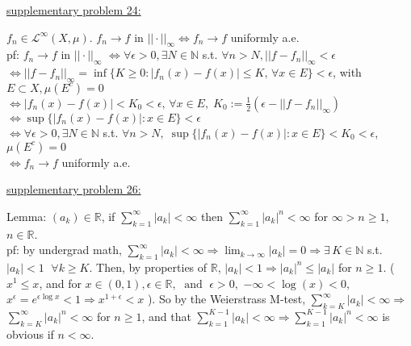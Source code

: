 \documentclass[12pt]{article}
\newcommand{\nats}[0] { \mathbb{N}}
\newcommand{\reals}[0] { \mathbb{R}}
\newcommand{\eps}[0] {  \epsilon }
\newcommand{\AND}[0]{ \; \textrm{ and } \;  }
\newcommand{\rimply}[0] { \Rightarrow }
\begin{document}
\begin{flushleft}
\underline{supplementary problem 24:}
\end{flushleft}

\begin{flushleft}
$f_n \in \mathcal{L}^\infty(X,\mu)$. $f_n \rightarrow f$ in $|| \cdot ||_\infty \Leftrightarrow f_n \rightarrow f$ uniformly a.e.\\
pf: $f_n \rightarrow f$ in $|| \cdot ||_\infty $ $\Leftrightarrow \forall \eps>0,  \exists N \in \nats$ s.t. $\forall n > N, ||f-f_n||_\infty < \eps $\\
$\Leftrightarrow ||f-f_n||_\infty = \inf\{ K \ge  0: |f_n(x)-f(x)|\le K, \, \forall x \in E \} < \eps$, with $E \subset X, \mu(E^c) = 0$\\
$\Leftrightarrow |f_n(x)-f(x)| < K_0 < \eps, \, \forall x \in E, \; K_0 := \frac{1}{2}(\eps - ||f-f_n||_\infty )$\\
$\Leftrightarrow \sup \{ |f_n(x)-f(x)| : x \in E \} < \eps $ \\
$\Leftrightarrow \forall \eps>0,  \exists N \in \nats$ s.t. $\forall n > N, \; \sup \{ |f_n(x)-f(x)| : x \in E \} < K_0 < \eps $, $\mu(E^c) = 0$  \\
$\Leftrightarrow f_n \rightarrow f$ uniformly a.e.
\end{flushleft}



\begin{flushleft}
\underline{supplementary problem 26:}
\end{flushleft}

\begin{flushleft}
Lemma: $(a_k) \in \reals$, if $\sum_{k=1}^\infty |a_k| < \infty$ then $\sum_{k=1}^\infty  |a_k|^n < \infty$ for $\infty > n \ge 1$, $n \in \reals$. \\
pf: by undergrad math, $\sum_{k=1}^\infty |a_k| < \infty \rimply \lim_{k \rightarrow \infty} |a_k| = 0 \rimply \exists \, K \in \nats $ s.t. $|a_k| < 1$ $\; \forall k \ge K$.
Then, by properties of $\reals$, $|a_k| < 1 \rimply |a_k|^n \le  |a_k|$ for $n \ge 1$. ( $ x^1 \le x$, and for $x \in (0,1), \eps \in \reals, \AND \eps > 0, $ $  -\infty < \log(x) < 0, $ $x^\eps = e^{\eps \log x} < 1 \rimply x^{1 + \eps} < x$ ). So by the Weierstrass M-test, $\sum_{k=K}^\infty |a_k| < \infty \rimply$  $\sum_{k=K}^\infty  |a_k|^n < \infty$ for $n \ge 1$, and that $\sum_{k=1}^{K-1} |a_k| < \infty  \rimply \sum_{k=1}^{K-1}  |a_k|^n < \infty $ is obvious if $n < \infty$.
\end{flushleft}
\end{document}
